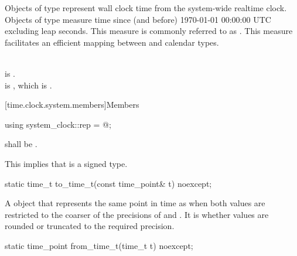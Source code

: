 \pnum
Objects of type  represent wall clock time from the system-wide
realtime clock.
Objects of type  measure time since (and before)
1970-01-01 00:00:00 UTC excluding leap seconds.
This measure is commonly referred to as .
This measure facilitates an efficient mapping between
 and calendar types.
\begin{example}
\\
 is . \\
 is ,
which is . \\
\end{example}

[time.clock.system.members]{Members}

%
\begin{itemdecl}
using system_clock::rep = @\unspec@;
\end{itemdecl}

\begin{itemdescr}
\pnum
\requires {} shall
be .\\
\begin{note}
This implies that  is a signed type.
\end{note}
\end{itemdescr}

%
\begin{itemdecl}
static time_t to_time_t(const time_point& t) noexcept;
\end{itemdecl}

\begin{itemdescr}
\pnum
\returns
A  object that represents the same point in time as 
when both values are restricted to the coarser of the precisions of  and
.
It is 
whether values are rounded or truncated to the required precision.
\end{itemdescr}

%
\begin{itemdecl}
static time_point from_time_t(time_t t) noexcept;
\end{itemdecl}

